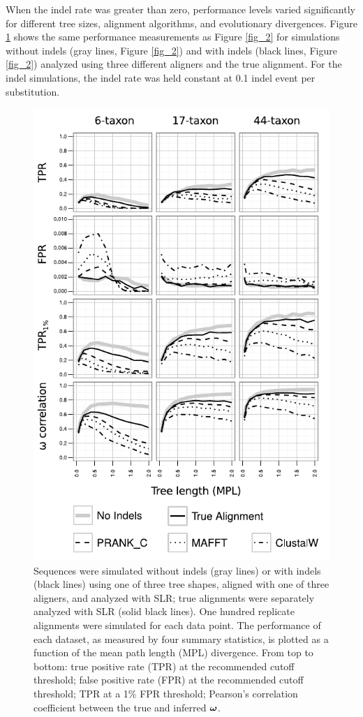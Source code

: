 \documentclass{mbe}
\begin{document}
When the indel rate was greater than zero, performance levels varied
significantly for different tree sizes, alignment algorithms, and
evolutionary divergences. Figure \ref{fig_3} shows the same
performance measurements as Figure \ref{fig_2} for simulations without
indels (gray lines, Figure \ref{fig_2}) and with indels (black lines,
Figure \ref{fig_2}) analyzed using three different aligners and the
true alignment. For the indel simulations, the indel rate was held
constant at 0.1 indel event per substitution.
\begin{figure}[t]
\begin{center}
\includegraphics[scale=0.75]{fig3.pdf}
\end{center}
\caption{Sequences were simulated without indels (gray lines) or with
  indels (black lines) using one of three tree shapes, aligned with
  one of three aligners, and analyzed with SLR; true alignments were
  separately analyzed with SLR (solid black lines). One hundred
  replicate alignments were simulated for each data point. The
  performance of each dataset, as measured by four summary statistics,
  is plotted as a function of the mean path length (MPL)
  divergence. From top to bottom: true positive rate (TPR) at the
  recommended cutoff threshold; false positive rate (FPR) at the
  recommended cutoff threshold; TPR at a 1\% FPR threshold; Pearson's
  correlation coefficient between the true and inferred $\bm{\omega}$.}
\label{fig_3}
\end{figure}
\end{document}
